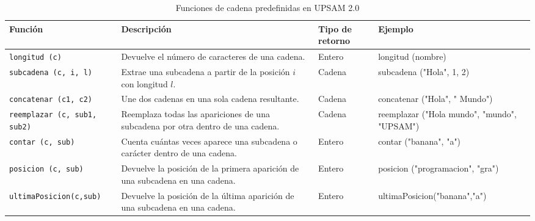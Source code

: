 \documentclass[12pt,twoside]{book}
\renewcommand{\arraystretch}{1.15}
\begin{document}
							\begin{table}[!hbt]
								\centering
								\caption{Funciones de cadena predefinidas en UPSAM 2.0}
								\label{tab:upsam_func_cad}
								\renewcommand{\arraystretch}{1.2}
								
								
								\begin{tabularx}{\textwidth}{
										>{\raggedright\arraybackslash}p{3.0cm}
										>{\raggedright\arraybackslash}X
										>{\raggedright\arraybackslash}p{2.4cm}
										Y
									}
									\hline
									\textbf{Función} & \textbf{Descripción} & \textbf{Tipo de retorno} & \textbf{Ejemplo} \\
									\hline
									\texttt{longitud (c)}
									& Devuelve el número de caracteres de una cadena.
									& Entero
									& longitud (nombre) \\
									
									\texttt{subcadena (c, i, l)}
									& Extrae una subcadena a partir de la posición $i$ con longitud $l$.
									& Cadena
									& subcadena ("Hola", 1, 2) \\
									
									\texttt{concatenar (c1, c2)}
									& Une dos cadenas en una sola cadena resultante.
									& Cadena
									& concatenar ("Hola", " Mundo") \\
									
									\texttt{reemplazar (c, sub1, sub2)}
									& Reemplaza todas las apariciones de una subcadena por otra dentro de una cadena.
									& Cadena
									& reemplazar ("Hola mundo", "mundo", "UPSAM") \\
									
									\texttt{contar (c, sub)}
									& Cuenta cuántas veces aparece una subcadena o carácter dentro de una cadena.
									& Entero
									& contar ("banana", "a") \\
									
									\texttt{posicion (c, sub)}
									& Devuelve la posición de la primera aparición de una subcadena en una cadena.
									& Entero
									& posicion ("programacion", "gra") \\
									
									\texttt{ultimaPosicion(c,sub)}
									& Devuelve la posición de la última aparición de una subcadena en una cadena.
									& Entero
									& ultimaPosicion("banana","a") \\
									

\end{tabularx}
\end{table}
\end{document}
